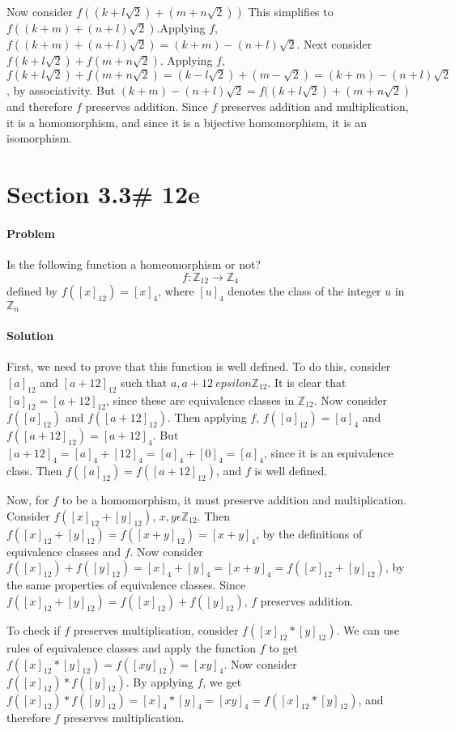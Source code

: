 \documentclass[a4paper,11pt]{article}
\begin{document}
Now consider $f((k+l\sqrt{2}) + (m + n\sqrt{2}))$ This simplifies to $f((k+m) + (n+l)\sqrt{2})$.Applying $f$, $f((k+m) + (n+l)\sqrt{2}) = (k+m) - (n+l)\sqrt{2}$.  Next consider $f(k + l\sqrt{2}) + f(m + n\sqrt{2})$. Applying $f$, $f(k + l\sqrt{2}) + f(m + n\sqrt{2}) = (k-l\sqrt{2}) + (m-\sqrt{2}) = (k+m) - (n+l)\sqrt{2}$, by associativity. But $(k+m) - (n+l)\sqrt{2} = f((k+l\sqrt{2}) + (m+n\sqrt{2})$ and therefore $f$ preserves addition.
 Since $f$ preserves addition and multiplication, it is a homomorphism, and since it is a bijective homomorphism, it is an isomorphism.

\section{Section 3.3\# 12e}
\paragraph{Problem} Is the following function a homeomorphism or not?
\begin{equation}
f: \mathbb{Z}_{12} \rightarrow \mathbb{Z}_4 
\end{equation}
defined by $f([x]_{12}) = [x]_4$, where $[u]_4$ denotes the class of the integer $u$ in $\mathbb{Z}_n$
\paragraph{Solution}
First, we need to prove that this function is well defined. To do this, consider $[a]_{12}$ and $[a+12]_{12}$ such that $a, a+12\ epsilon \mathbb{Z}_{12}$. It is clear that $[a]_{12} = [a+12]_{12}$, since these are equivalence classes in $\mathbb{Z}_{12}$. Now consider $f([a]_{12})$ and $f([a+12]_{12})$. Then applying $f$, $f([a]_{12}) = [a]_4$ and $f([a+12]_{12}) = [a+12]_4$. But $[a+12]_4 = [a]_4 + [12]_4 = [a]_4 + [0]_4 = [a]_4$, since it is an equivalence class. Then $f([a]_{12}) = f([a+12]_{12}) $, and $f$ is well defined.

Now, for $f$ to be a homomorphism, it must preserve addition and multiplication. Consider $f([x]_{12} + [y]_{12})$, $x,y \epsilon \mathbb{Z}_{12}$. Then $f([x]_{12} + [y]_{12}) = f([x+y]_{12}) = [x+y]_{4}$, by the definitions of equivalence classes and $f$. Now consider $f([x]_{12}) + f([y]_{12}) = [x]_4 + [y]_4 = [x+y]_4 = f([x]_{12} + [y]_{12})$, by the same properties of equivalence classes. Since $f([x]_{12} + [y]_{12}) = f([x]_{12}) + f([y]_{12})$, $f$ preserves addition.

 To check if $f$ preserves multiplication, consider $f([x]_{12}*[y]_{12})$. We can use rules of equivalence classes and apply the function $f$ to get $f([x]_{12}*[y]_{12}) = f([xy]_{12}) = [xy]_4$. Now consider $f([x]_{12}) * f([y]_{12})$. By applying $f$, we get $f([x]_{12}) * f([y]_{12}) = [x]_4 * [y]_4 = [xy]_4 = f([x]_{12}*[y]_{12})$, and therefore $f$ preserves multiplication.
\end{document}
